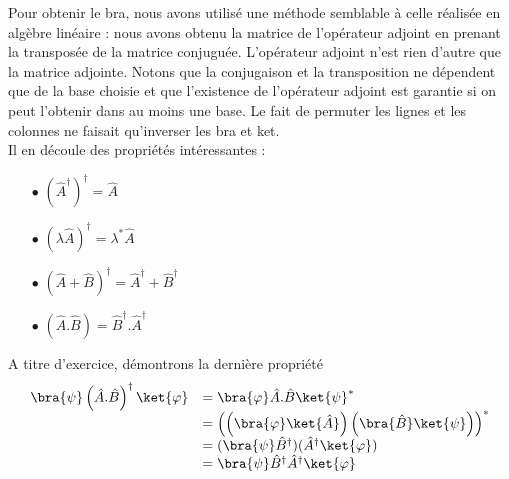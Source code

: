 Pour obtenir le bra, nous avons utilisé une méthode semblable à celle
réalisée en algèbre linéaire : nous avons obtenu la matrice de l'opérateur
adjoint en prenant la transposée de la matrice conjuguée.
L'opérateur adjoint n'est rien d'autre que la matrice adjointe.
Notons que la conjugaison et la transposition ne dépendent que de la base
choisie et que l'existence de l'opérateur adjoint est garantie si on peut l'obtenir
dans au moins une base. Le fait de permuter les lignes et les colonnes ne faisait 
qu'inverser les bra et ket.\\
Il en découle des propriétés intéressantes :
\begin{multicols}{2}
\begin{itemize}
\item[$\bullet$] $\left(\hat{A}^\dagger\right)^\dagger = \hat{A}$
\item[$\bullet$] $\left(\lambda\hat{A}\right)^\dagger = \lambda^*\hat{A}$
\item[$\bullet$] $\left(\hat{A}+\hat{B}\right)^\dagger = \hat{A}^\dagger+\hat{B}^\dagger$
\item[$\bullet$] $\left(\hat{A}.\hat{B}\right) = \hat{B}^\dagger.\hat{A}^\dagger$
\end{itemize}
\end{multicols}
A titre d'exercice, démontrons la dernière propriété
\begin{equation}
\begin{array}{ll}
\bra{\psi}\left(\hat{A}.\hat{B}\right)^\dagger\ket{\varphi} &= \bra{\varphi}\hat{A}.
\hat{B}\ket{\psi}^*\\
&= \left(\left(\bra{\varphi}\ket{\hat{A}}\right)\left(\bra{\hat{B}}\ket{\psi}\right)\right)^*\\
&= (\bra{\psi}\hat{B}^\dagger)(\hat{A}^\dagger\ket{\varphi})\\
&= \bra{\psi}\hat{B}^\dagger\hat{A}^\dagger\ket{\varphi}
\end{array}
\end{equation}

